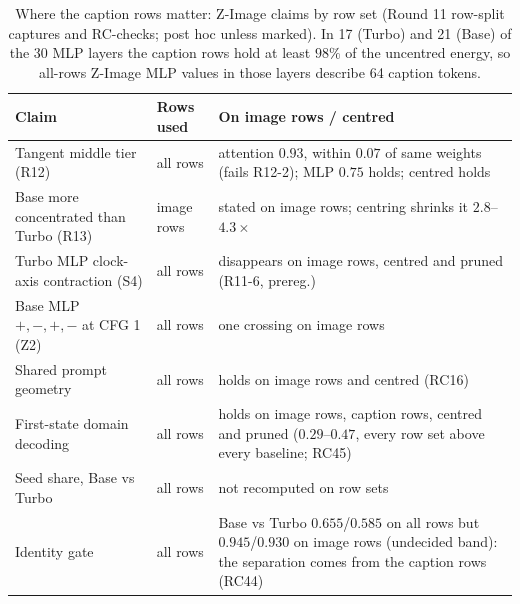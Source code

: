 \documentclass[11pt]{article}
\begin{document}
\begin{table}[htbp]
\centering\small
\caption{Where the caption rows matter: Z-Image claims by row set (Round 11 row-split captures and RC-checks; post hoc unless marked). In 17 (Turbo) and 21 (Base) of the 30 MLP layers the caption rows hold at least $98\%$ of the uncentred energy, so all-rows Z-Image MLP values in those layers describe 64 caption tokens.}
\label{tab:captionmap}
\begin{tabularx}{\linewidth}{@{}LlL@{}}
\toprule
Claim & Rows used & On image rows / centred\\
\midrule
Tangent middle tier (R12) & all rows & attention $0.93$, within $0.07$ of same weights (fails R12-2); MLP $0.75$ holds; centred holds\\
Base more concentrated than Turbo (R13) & image rows & stated on image rows; centring shrinks it $2.8$--$4.3\times$\\
Turbo MLP clock-axis contraction (S4) & all rows & disappears on image rows, centred and pruned (R11-6, prereg.)\\
Base MLP $+,-,+,-$ at CFG 1 (Z2) & all rows & one crossing on image rows\\
Shared prompt geometry & all rows & holds on image rows and centred (RC16)\\
First-state domain decoding & all rows & holds on image rows, caption rows, centred and pruned ($0.29$--$0.47$, every row set above every baseline; RC45)\\
Seed share, Base vs Turbo & all rows & not recomputed on row sets\\
Identity gate & all rows & Base vs Turbo $0.655$/$0.585$ on all rows but $0.945$/$0.930$ on image rows (undecided band): the separation comes from the caption rows (RC44)\\
\bottomrule
\end{tabularx}
\end{table}
\end{document}
